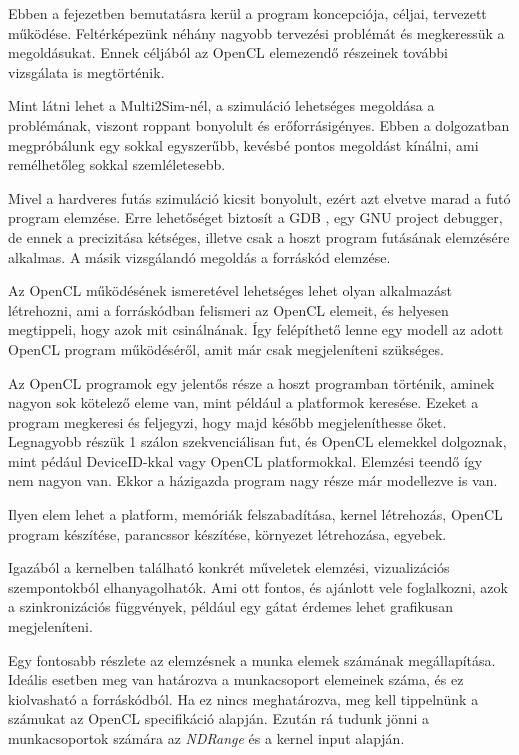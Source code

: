
Ebben a fejezetben bemutatásra kerül a program koncepciója, céljai, tervezett működése. Feltérképezünk néhány nagyobb tervezési problémát és megkeressük a megoldásukat. Ennek céljából az OpenCL elemezendő részeinek további vizsgálata is megtörténik.

Mint látni lehet a Multi2Sim-nél, a szimuláció lehetséges megoldása a problémának, viszont roppant bonyolult és erőforrásigényes. Ebben a dolgozatban megpróbálunk egy sokkal egyszerűbb, kevésbé pontos megoldást kínálni, ami remélhetőleg sokkal szemléletesebb. 

Mivel a hardveres futás szimuláció kicsit bonyolult, ezért azt elvetve marad a futó program elemzése. Erre lehetőséget biztosít a GDB \cite{gdb}, egy GNU project debugger, de ennek a precizitása kétséges, illetve csak a hoszt program futásának elemzésére alkalmas. A másik vizsgálandó megoldás a forráskód elemzése.

Az OpenCL működésének ismeretével lehetséges lehet olyan alkalmazást létrehozni, ami a forráskódban felismeri az OpenCL elemeit, és helyesen megtippeli, hogy azok mit csinálnának. Így felépíthető lenne egy modell az adott OpenCL program működéséről, amit már csak megjeleníteni szükséges.
 
Az OpenCL programok egy jelentős része a hoszt programban történik, aminek nagyon sok kötelező eleme van, mint például a platformok keresése. Ezeket a program megkeresi és feljegyzi, hogy majd később megjeleníthesse őket. Legnagyobb részük 1 szálon szekvenciálisan fut, és OpenCL elemekkel dolgoznak, mint pédául DeviceID-kkal vagy OpenCL platformokkal. Elemzési teendő így nem nagyon van. Ekkor a házigazda program nagy része már modellezve is van.

Ilyen elem lehet a platform, memóriák felszabadítása, kernel létrehozás, OpenCL program készítése, parancssor készítése, környezet létrehozása, egyebek.



Igazából a kernelben található konkrét műveletek elemzési, vizualizációs szempontokból elhanyagolhatók. Ami ott fontos, és ajánlott vele foglalkozni, azok a szinkronizációs függvények, például egy gátat érdemes lehet grafikusan megjeleníteni.

Egy fontosabb részlete az elemzésnek a munka elemek számának megállapítása. Ideális esetben meg van határozva a munkacsoport elemeinek száma, és ez kiolvasható a forráskódból. Ha ez nincs meghatározva, meg kell tippelnünk a számukat az OpenCL specifikáció alapján. Ezután rá tudunk jönni a munkacsoportok számára az \textit{NDRange} és a kernel input alapján.

